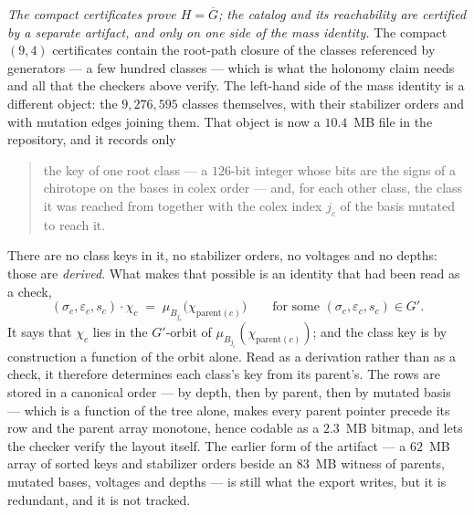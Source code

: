 \documentclass[11pt]{amsart}
\theoremstyle{remark}
\newcommand{\Gbar}{\overline{G}}
\begin{document}
\emph{The compact certificates prove $H=\Gbar$; the catalog and its
reachability are certified by a separate artifact, and only on one side of
the mass identity.} The compact $(9,4)$ certificates contain the root-path
closure of the classes referenced by generators --- a few hundred classes
--- which is what the holonomy claim needs and all that the checkers above
verify. The left-hand side of the mass identity is a different object: the
$9{,}276{,}595$ classes themselves, with their stabilizer orders and with
mutation edges joining them. That object is now a $10.4$~MB file in the
repository, and it records only
\begin{quote}
the key of one root class --- a $126$-bit integer whose bits are the signs
of a chirotope on the bases in colex order --- and, for each other class,
the class it was reached from together with the colex index $j_c$ of the
basis mutated to reach it.
\end{quote}
There are no class keys in it, no stabilizer orders, no voltages and no
depths: those are \emph{derived}. What makes that possible is an identity
that had been read as a check,
\[
  (\sigma_c,\varepsilon_c,s_c)\cdot\chi_c
   \;=\;\mu_{B_{j_c}}\bigl(\chi_{\mathrm{parent}(c)}\bigr)
   \qquad\text{for some }(\sigma_c,\varepsilon_c,s_c)\in G' .
\]
It says that $\chi_c$ lies in the $G'$-orbit of
$\mu_{B_{j_c}}(\chi_{\mathrm{parent}(c)})$; and the class key is by
construction a function of the orbit alone. Read as a derivation rather
than as a check, it therefore determines each class's key from its
parent's. The rows are stored in a canonical order --- by depth, then by
parent, then by mutated basis --- which is a function of the tree alone,
makes every parent pointer precede its row and the parent array monotone,
hence codable as a $2.3$~MB bitmap, and lets the checker verify the layout
itself. The earlier form of the artifact --- a $62$~MB array of sorted
keys and stabilizer orders beside an $83$~MB witness of parents, mutated
bases, voltages and depths --- is still what the export writes, but it is
redundant, and it is not tracked.
\end{document}
